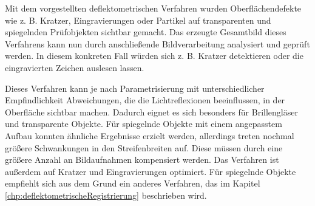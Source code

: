 \noindent
Mit dem vorgestellten deflektometrischen Verfahren wurden Oberflächendefekte wie z. B. Kratzer, Eingravierungen oder Partikel auf transparenten und spiegelnden Prüfobjekten sichtbar gemacht.
Das erzeugte Gesamtbild dieses Verfahrens kann nun durch anschließende Bildverarbeitung analysiert und geprüft werden.
In diesem konkreten Fall würden sich z. B. Kratzer detektieren oder die eingravierten Zeichen auslesen lassen.

\p
Dieses Verfahren kann je nach Parametrisierung mit unterschiedlicher Empfindlichkeit Abweichungen, die die Lichtreflexionen beeinflussen, in der Oberfläche sichtbar machen.
Dadurch eignet es sich besonders für Brillengläser und transparente Objekte.
Für spiegelnde Objekte mit einem angepasstem Aufbau konnten ähnliche Ergebnisse erzielt werden, allerdings treten nochmal größere Schwankungen in den Streifenbreiten auf.
Diese müssen durch eine größere Anzahl an Bildaufnahmen kompensiert werden.
Das Verfahren ist außerdem auf Kratzer und Eingravierungen optimiert.
Für spiegelnde Objekte empfiehlt sich aus dem Grund ein anderes Verfahren, das im Kapitel \ref{chp:deflektometrischeRegistrierung} beschrieben wird.